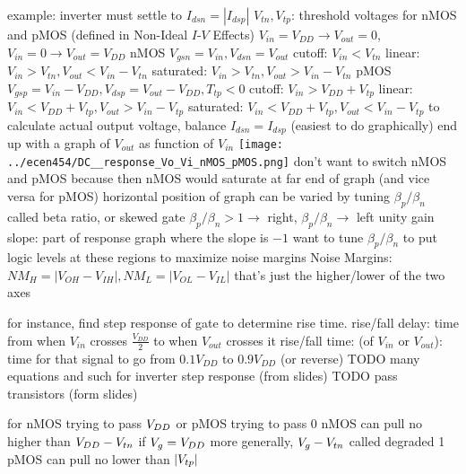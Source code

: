 \documentclass[12pt]{article}
\begin{document}
\begin{spacing}{0.8}
\begin{multicols*}{2}
\begin{flushleft}
\begin{outline}[longenum]
  \1 example: inverter
  \1 must settle to $I_{dsn}=|I_{dsp}|$
  \1 $V_{tn}, V_{tp}$: threshold voltages for nMOS and pMOS 
    (defined in Non-Ideal $I$-$V$ Effects)
  \1 $V_{in}=V_{DD} \rightarrow V_{out}=0$, $V_{in}=0 \rightarrow V_{out}=V_{DD}$
  \1 nMOS
    \2 $V_{gsn}=V_{in}, V_{dsn}=V_{out}$
    \2 cutoff:    $V_{in}<V_{tn}$
    \2 linear:    $V_{in}>V_{tn}, V_{out}<V_{in}-V_{tn}$
    \2 saturated: $V_{in}>V_{tn}, V_{out}>V_{in}-V_{tn}$
  \1 pMOS
    \2 $V_{gsp}=V_{in}-V_{DD}, V_{dsp}=V_{out}-V_{DD}, T_{tp}<0$
    \2 cutoff:    $V_{in}>V_{DD}+V_{tp}$
    \2 linear:    $V_{in}<V_{DD}+V_{tp}, V_{out}>V_{in}-V_{tp}$
    \2 saturated: $V_{in}<V_{DD}+V_{tp}, V_{out}<V_{in}-V_{tp}$
  \1 to calculate actual output voltage, balance $I_{dsn}=I_{dsp}$ (easiest to do graphically)
    \2 end up with a graph of $V_{out}$ as function of $V_{in}$
    \texttt{[image: ../ecen454/DC\_\_response\_Vo\_Vi\_nMOS\_pMOS.png]}
    \2 don't want to switch nMOS and pMOS because then nMOS would saturate at far end of graph (and vice versa for pMOS)
    \2 horizontal position of graph can be varied by tuning $\beta_p / \beta_n$
      \3 called beta ratio, or skewed gate
      \3 $\beta_p / \beta_n>1 \rightarrow$ right, $\beta_p / \beta_n\rightarrow$ left
    \2 unity gain slope: part of response graph where the slope is $-1$
      \3 want to tune $\beta_p / \beta_n$ to put logic levels at these regions to maximize noise margins
    \2 Noise Margins:
      \3 $NM_H=|V_{OH}-V_{IH}|, NM_L=|V_{OL}-V_{IL}|$
      \3 that's just the higher/lower of the two axes

  \1 for instance, find step response of gate to determine rise time.
  \1 rise/fall delay: time from when $V_{in}$ crosses $\frac{V_{DD}}{2}$ to when $V_{out}$ crosses it
  \1 rise/fall time: (of $V_{in}$ or $V_{out}$): time for that signal to go from $0.1V_{DD}$ to $0.9V_{DD}$ (or reverse)
  \1 TODO many equations and such for inverter step response (from slides)
  \1 TODO pass transistors (form slides)

  \1 for nMOS trying to pass $V_{DD}$ or pMOS trying to pass 0
  \1 nMOS can pull no higher than $V_{DD}-V_{tn}$ if $V_{g}=V_{DD}$
    \2 more generally, $V_{g}-V_{tn}$
    \2 called degraded 1
  \1 pMOS can pull no lower than $|V_{tp}|$


\end{outline}
\end{flushleft}
\end{multicols*}
\end{spacing}
\end{document}
